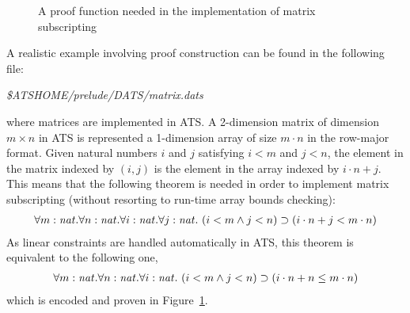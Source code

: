 \begin{figure}

\caption{A proof function needed in the implementation of matrix subscripting}
\label{figure:lemma_for_matrix_subscripting}
\end{figure}
\kern6pt
A realistic example involving proof construction can be found in
the following file:
\begin{center}
{\it \$ATSHOME/prelude/DATS/matrix.dats}
\end{center}
where matrices are implemented in ATS. A 2-dimension matrix of dimension
$m\times n$ in ATS is represented a 1-dimension array of size $m\cdot n$ in
the row-major format. Given natural numbers $i$ and $j$ satisfying $i<m$
and $j<n$, the element in the matrix indexed by $(i,j)$ is the element in
the array indexed by $i\cdot n+j$. This means that the following theorem is
needed in order to implement matrix subscripting (without resorting to
run-time array bounds checking):
\[\begin{array}{l}
\forall m:{\it nat}.\forall n:{\it nat}.\forall i:{\it nat}.\forall j:{\it nat}.~
(i<m\land j<n)\supset (i\cdot n + j < m\cdot n)
\end{array}\]
As linear constraints are handled automatically in ATS,
this theorem is equivalent to the following one,
\[\begin{array}{l}
\forall m:{\it nat}.\forall n:{\it nat}.\forall i:{\it nat}.~
(i<m\land j<n)\supset (i\cdot n + n \leq m\cdot n)
\end{array}\]
which is encoded and proven in Figure~\ref{figure:lemma_for_matrix_subscripting}.

